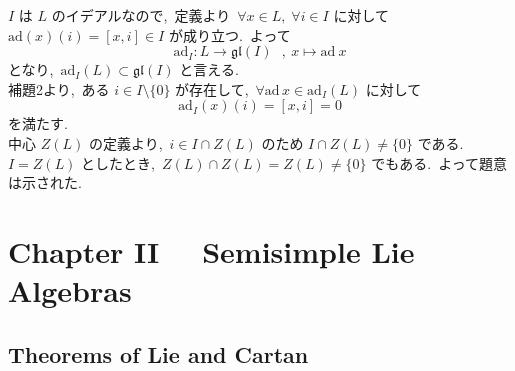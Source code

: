 \documentclass[uplatex,dvipdfmx]{jsarticle}
\begin{document}
\begin{myproof}
$I$ は $L$ のイデアルなので,~定義より~$\forall x \in L,\; \forall i \in I$ に対して $\text{ad}(x)(i)=[x, i] \in I$ が成り立つ.~よって
\begin{equation*}
    \text{ad}_I:L\to \mathfrak{gl}(I) ~~~,~x\mapsto \text{ad}~x
\end{equation*}
となり,~$\text{ad}_I(L) \subset \mathfrak{gl}(I)$ と言える.\\
補題2より,~ある $i \in I \setminus \{0\}$ が存在して,~$\forall \mathrm{ad}\,x \in \text{ad}_I(L)$ に対して
\begin{equation*}
    \text{ad}_I(x)(i) = [x, i] = 0
\end{equation*}
を満たす.\\
中心 $Z(L)$ の定義より,~$i \in I \cap Z(L)$ のため $I \cap Z(L) \neq \{0\}$ である.\\
$I = Z(L)$ としたとき,~$Z(L) \cap Z(L) = Z(L) \neq \{0\}$ でもある.~よって題意は示された.
\end{myproof}
\newpage
\section{Chapter I\hspace{-1.2pt}I ~~Semisimple Lie Algebras}
\subsection{Theorems of Lie and Cartan}
\end{document}
